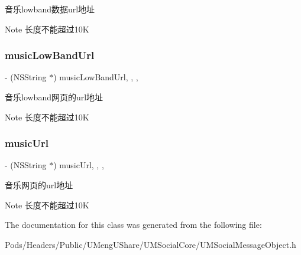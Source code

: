 音乐lowband数据url地址 \begin{DoxyNote}{Note}
长度不能超过10K 
\end{DoxyNote}
\mbox{\label{interface_u_m_share_music_object_a88baa03406b2bbaa12cfbf0389e37245}} 
\subsubsection{\texorpdfstring{music\+Low\+Band\+Url}{musicLowBandUrl}}
{\footnotesize\ttfamily -\/ (N\+S\+String $\ast$) music\+Low\+Band\+Url\hspace{0.3cm}{\ttfamily [read]}, {\ttfamily [write]}, {\ttfamily [nonatomic]}, {\ttfamily [retain]}}

音乐lowband网页的url地址 \begin{DoxyNote}{Note}
长度不能超过10K 
\end{DoxyNote}
\mbox{\label{interface_u_m_share_music_object_adcef82e04caa8ff74b854e4df7f0d800}} 
\subsubsection{\texorpdfstring{music\+Url}{musicUrl}}
{\footnotesize\ttfamily -\/ (N\+S\+String $\ast$) music\+Url\hspace{0.3cm}{\ttfamily [read]}, {\ttfamily [write]}, {\ttfamily [nonatomic]}, {\ttfamily [retain]}}

音乐网页的url地址 \begin{DoxyNote}{Note}
长度不能超过10K 
\end{DoxyNote}


The documentation for this class was generated from the following file\+:\begin{DoxyCompactItemize}
\item 
Pods/\+Headers/\+Public/\+U\+Meng\+U\+Share/\+U\+M\+Social\+Core/U\+M\+Social\+Message\+Object.\+h\end{DoxyCompactItemize}

